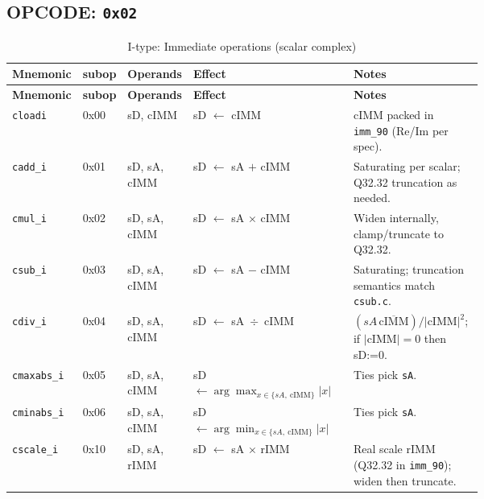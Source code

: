 \documentclass[10pt]{article}
\begin{document}
\subsection*{OPCODE: \texttt{0x02}}
\begin{longtable}{@{}l l l L{0.38\linewidth} L{0.30\linewidth}@{}}
\caption{I-type: Immediate operations (scalar complex)}\label{tab:itype}\\
\toprule
\textbf{Mnemonic} & \textbf{subop} & \textbf{Operands} & \textbf{Effect} & \textbf{Notes} \\
\midrule
\endfirsthead
\toprule
\textbf{Mnemonic} & \textbf{subop} & \textbf{Operands} & \textbf{Effect} & \textbf{Notes} \\
\midrule
\endhead
\texttt{cloadi}   & 0x00 & sD, cIMM       & sD $\leftarrow$ cIMM
  & cIMM packed in \texttt{imm\_90} (Re/Im per spec). \\

\texttt{cadd\_i}  & 0x01 & sD, sA, cIMM   & sD $\leftarrow$ sA $+$ cIMM
  & Saturating per scalar; Q32.32 truncation as needed. \\

\texttt{cmul\_i}  & 0x02 & sD, sA, cIMM   & sD $\leftarrow$ sA $\times$ cIMM
  & Widen internally, clamp/truncate to Q32.32. \\

\texttt{csub\_i}  & 0x03 & sD, sA, cIMM   & sD $\leftarrow$ sA $-$ cIMM
  & Saturating; truncation semantics match \texttt{csub.c}. \\

\texttt{cdiv\_i}  & 0x04 & sD, sA, cIMM   & sD $\leftarrow$ sA \,$\div$\, cIMM
  & $(sA\,\overline{\text{cIMM}})/|\text{cIMM}|^2$; if $|\text{cIMM}|{=}0$ then sD:=0. \\

\texttt{cmaxabs\_i} & 0x05 & sD, sA, cIMM & sD $\leftarrow \arg\max_{x\in\{sA,\ \text{cIMM}\}} |x|$
  & Ties pick \texttt{sA}. \\

\texttt{cminabs\_i} & 0x06 & sD, sA, cIMM & sD $\leftarrow \arg\min_{x\in\{sA,\ \text{cIMM}\}} |x|$
  & Ties pick \texttt{sA}. \\

\texttt{cscale\_i} & 0x10 & sD, sA, rIMM  & sD $\leftarrow$ sA $\times$ rIMM
  & Real scale rIMM (Q32.32 in \texttt{imm\_90}); widen then truncate. \\

\bottomrule
\end{longtable}


\end{document}
